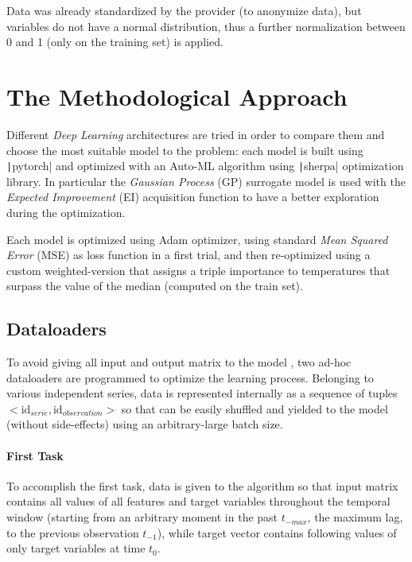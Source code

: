 Data was already standardized by the provider (to anonymize data), but variables do not have a normal distribution, thus a further normalization between 0 and 1 (only on the training set) is applied.

\section{The Methodological Approach}
Different \textit{Deep Learning} architectures are tried in order to compare them and choose the most suitable model to the problem: each model is built using \texttt|pytorch| and optimized with an Auto-ML algorithm using \texttt|sherpa| optimization library. In particular the \textit{Gaussian Process} (GP) surrogate model is used with the \textit{Expected Improvement} (EI) acquisition function to have a better exploration during the optimization.

Each model is optimized using Adam optimizer, using standard \textit{Mean Squared Error} (MSE) as loss function in a first trial, and then re-optimized using a custom weighted-version that assigns a triple importance to temperatures that surpass the value of the median (computed on the train set).

\subsection{Dataloaders}
To avoid giving all input and output matrix to the model%
, two ad-hoc dataloaders are programmed to optimize the learning process.
Belonging to various independent series, data is represented internally as a sequence of tuples $<\text{id}_{serie}, \text{id}_{observation}>$ so that can be easily shuffled and yielded to the model (without side-effects) using an arbitrary-large batch size.

\paragraph{First Task}
To accomplish the first task, data is given to the algorithm so that input matrix contains all values of all features and target variables throughout the temporal window (starting from an arbitrary moment in the past $t_{-max}$, the maximum lag, to the previous observation $t_{-1}$), while target vector contains following values of only target variables at time $t_0$.

